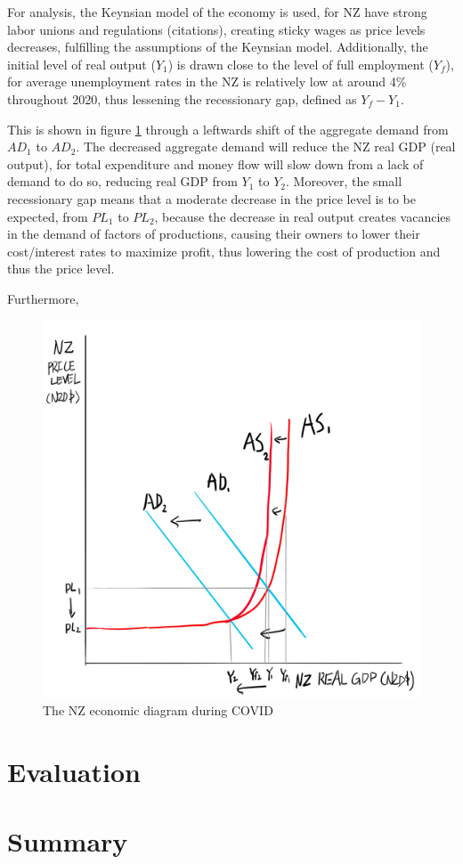 \documentclass[a4paper,12pt]{article}
\begin{document}
For analysis, the Keynsian model of the economy is used, for NZ have strong labor unions and regulations (citations), creating sticky wages as price levels decreases, fulfilling the assumptions of the Keynsian model. Additionally, the initial level of real output ($Y_1$) is drawn close to the level of full employment ($Y_f$), for average unemployment rates in the NZ is relatively low at around 4\% throughout 2020, thus lessening the recessionary gap, defined as $Y_f-Y_1$.

This is shown in figure \ref{fig:asad} through a leftwards shift of the aggregate demand from $AD_1$ to $AD_2$. The decreased aggregate demand will reduce the NZ real GDP (real output), for total expenditure and money flow will slow down from a lack of demand to do so, reducing real GDP from $Y_1$ to $Y_2$. Moreover, the small recessionary gap means that a moderate decrease in the price level is to be expected, from $PL_1$ to $PL_2$, because the decrease in real output creates vacancies in the demand of factors of productions, causing their owners to lower their cost/interest rates to maximize profit, thus lowering the cost of production and thus the price level.

Furthermore, 
 
 
\begin{figure}[H]
    \centering
    \includegraphics[scale=0.6]{assets/asad.png}
    \caption{The NZ economic diagram during COVID}
    \label{fig:asad}
\end{figure}

\section*{Evaluation}


\section*{Summary}

\end{document}
